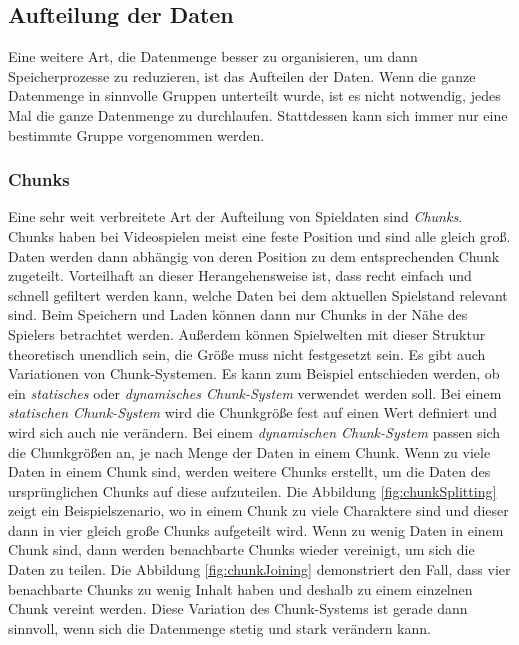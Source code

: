 \subsection{Aufteilung der Daten} 
Eine weitere Art, die Datenmenge besser zu organisieren, um dann Speicherprozesse zu reduzieren, ist das Aufteilen der Daten. Wenn die ganze Datenmenge in sinnvolle Gruppen unterteilt wurde, ist es nicht notwendig, jedes Mal die ganze Datenmenge zu durchlaufen. Stattdessen kann sich immer nur eine bestimmte Gruppe vorgenommen werden.

\subsubsection{Chunks} \label{sssect:chunks}
Eine sehr weit verbreitete Art der Aufteilung von Spieldaten sind \textit{Chunks}. Chunks haben bei Videospielen meist eine feste Position und sind alle gleich groß. Daten werden dann abhängig von deren Position zu dem entsprechenden Chunk zugeteilt. Vorteilhaft an dieser Herangehensweise ist, dass recht einfach und schnell gefiltert werden kann, welche Daten bei dem aktuellen Spielstand relevant sind. Beim Speichern und Laden können dann nur Chunks in der Nähe des Spielers betrachtet werden. Außerdem können Spielwelten mit dieser Struktur theoretisch unendlich sein, die Größe muss nicht festgesetzt sein. Es gibt auch Variationen von Chunk-Systemen. Es kann zum Beispiel entschieden werden, ob ein \textit{statisches} oder \textit{dynamisches Chunk-System} verwendet werden soll. Bei einem \textit{statischen Chunk-System} wird die Chunkgröße fest auf einen Wert definiert und wird sich auch nie verändern. Bei einem \textit{dynamischen Chunk-System} passen sich die Chunkgrößen an, je nach Menge der Daten in einem Chunk. Wenn zu viele Daten in einem Chunk sind, werden weitere Chunks erstellt, um die Daten des ursprünglichen Chunks auf diese aufzuteilen. Die Abbildung \ref{fig:chunkSplitting} zeigt ein Beispielszenario, wo in einem Chunk zu viele Charaktere sind und dieser dann in vier gleich große Chunks aufgeteilt wird. Wenn zu wenig Daten in einem Chunk sind, dann werden benachbarte Chunks wieder vereinigt, um sich die Daten zu teilen. Die Abbildung \ref{fig:chunkJoining} demonstriert den Fall, dass vier benachbarte Chunks zu wenig Inhalt haben und deshalb zu einem einzelnen Chunk vereint werden. Diese Variation des Chunk-Systems ist gerade dann sinnvoll, wenn sich die Datenmenge stetig und stark verändern kann. 

